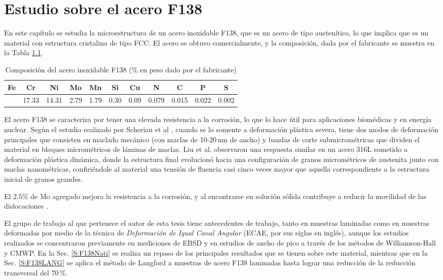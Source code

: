 \chapter{Estudio sobre el acero F138}\label{C:F138}
\graphicspath{{./figs/04_F138/}}

En este capítulo se estudia la microestructura de un acero inoxidable F138, que es un acero de tipo austenítico, lo que implica que es un material con estructura cristalina de tipo FCC.
El acero se obtuvo comercialmente, y la composición, dada por el fabricante se muestra en la Tabla \ref{tab:F138Comp}.

\begin{table}[!htb]
\centering
\begin{tabular}{|c|c|c|c|c|c|c|c|c|c|c|}
\hline
\rowcolor[HTML]{BBDAFF} 
\textbf{Fe} & \textbf{Cr} & \textbf{Ni} & \textbf{Mo} & \textbf{Mn} & \textbf{Si} & \textbf{Cu} & \textbf{N} & \textbf{C} & \textbf{P} & \textbf{S} \\ \hline
          &    17.33  &   14.31   &   2.79    &   1.79    &  0.30     &   0.09    &   0.079   &  0.015    &   0.022   &   0.002   \\ \hline
\end{tabular}
\caption{Composición del acero inoxidable F138 (\% en peso dado por el fabricante)}
\label{tab:F138Comp}
\end{table}

El acero F138 se caracteriza por tener una elevada resistencia a la corrosión, lo que lo hace útil para aplicaciones biomédicas y en energía nuclear.
Según el estudio realizado por Scheriau et al \cite{Scheriau2011}, cuando se lo somente a deformación plástica severa, tiene dos modos de deformación principales que consisten en maclado mecánico (con maclas de 10-20\,nm de ancho) y bandas de corte submicrométricas que dividen el material en bloques micrométricos de láminas de maclas.
Liu et al. \cite{Liu2010} observaron una respuesta similar en un acero 316L sometido a deformación plástica dinámica, donde la estructura final evolucionó hacia una configuración de granos micrométricos de austenita junto con maclas nanométricas, confiriéndole al material una tensión de fluencia casi cinco veces mayor que aquella correspondiente a la estructura inicial de granos grandes.

El 2.5\% de Mo agregado mejora la resistencia a la corrosión, y al encontrarse en solución sólida contribuye a reducir la movilidad de las dislocaciones \cite{Chowdhury2005}.

El grupo de trabajo al que pertenece el autor de esta tesis tiene antecedentes de trabajo, tanto en muestras laminadas como en muestras deformadas por medio de la técnica de \textit{Deformación de Igual Canal Angular} (ECAE, por sus siglas en inglés)\cite{Devincentis2015PhD,Devincentis2017}, aunque los estudios realizados se concentraron previamente en mediciones de EBSD y en estudios de ancho de pico a través de los métodos de Williamson-Hall y CMWP.
En la Sec. \ref{S:F138Nati} se realiza un repaso de los principales resultados que se tienen sobre este material, mientras que en la Sec. \ref{S:F138LANG} se aplica el método de Langford a muestras de acero F138 laminadas hasta lograr una reducción de la reducción transversal del 70\,\%.

